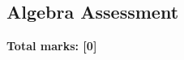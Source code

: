 \documentclass[../c1]{subfiles}
\begin{document}
\subsection*{Algebra Assessment}
\thispagestyle{fancy}



\begin{flushright}
\textbf{Total marks: [0]}
\end{flushright}
\end{document}
